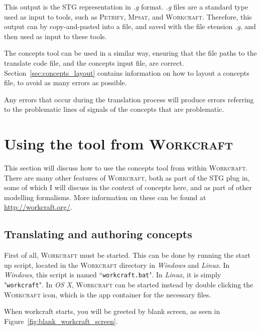 \documentclass{proc}
\newcommand{\noun}[1]{\textsc{#1}}
\begin{document}
This output is the STG representation in \emph{.g} format. \emph{.g} files are a standard type used as input to tools, such as \noun{Petrify}, \noun{Mpsat}, and \noun{Workcraft}. 
Therefore, this output can by copy-and-pasted into a file, and saved with the file etension \emph{.g}, and then used as input to these tools. 

The concepts tool can be used in a similar way, ensuring that the file paths to the translate code file, and the concepts input file, are correct. Section~\ref{sec:concepts_layout} contains 
information on how to layout a concepts file, to avoid as many errors as possible. 

Any errors that occur during the translation process will produce errors referring to the problematic lines of signals of the concepts that are problematic. 

\section{Using the tool from \noun{Workcraft} \label{sec:workcraft_usage}}

This section will discuss how to use the concepts tool from within \noun{Workcraft}. There are many other features of \noun{Workcraft}, both as part of the STG plug in, some of which I
 will discuss in the context of concepts here, and as part of other modelling formalisms. More information on these can be found at \url{http://workcraft.org/}.
 
\subsection{Translating and authoring concepts}

First of all, \noun{Workcraft} must be started. This can be done by running the start up script, located in the \noun{Workcraft} directory in \emph{Windows} and \emph{Linux}. In 
\emph{Windows}, this script is named ``\texttt{workcraft.bat}". In \emph{Linux}, it is simply "\texttt{workcraft}". In \emph{OS X}, \noun{Workcraft} can be started instead by double 
clicking the \noun{Workcraft} icon, which is the app container for the necessary files. 

When workcraft starts, you will be greeted by blank screen, as seen in Figure~\ref{fig:blank_workcraft_screen}.
\end{document}
